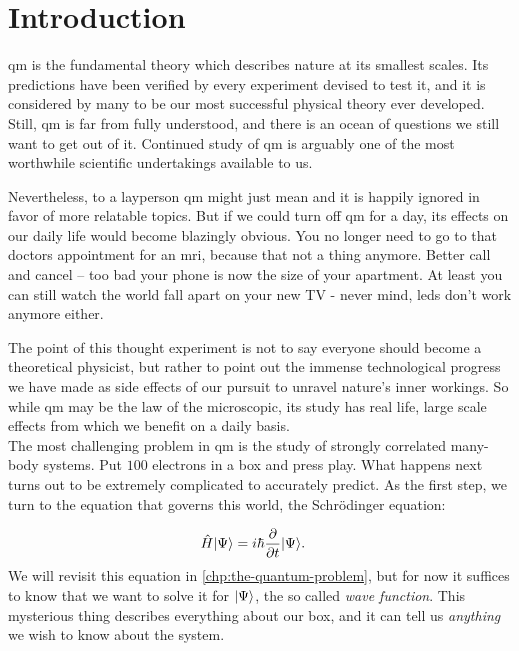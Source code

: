 \documentclass[Thesis.tex]{subfiles}
\begin{document}
\chapter{Introduction}
\label{chp:introduction}

\Gls{qm} is the fundamental theory which describes nature at its
smallest scales. Its predictions have been verified by every experiment
devised to test it, and it is considered by many to be our most successful physical
theory ever developed. Still, \gls{qm} is far from fully understood, and there is an ocean of
questions we still want to get out of it. Continued study of \gls{qm} is arguably one
of the most worthwhile scientific undertakings available to us.

Nevertheless, to a layperson \acrshort{qm} might just mean  and it
is happily ignored in favor of more relatable topics. But if we could turn off \gls{qm}
for a day, its effects on our daily life would become blazingly obvious. You no
longer need to go to that doctors appointment for an \acrshort{mri}, because that not a
thing anymore. Better call and cancel -- too bad your phone is now the size of
your apartment. At least you can still watch the world fall apart on your new TV -
never mind, \acrshort{led}s don't work anymore either.

The point of this thought experiment is not to say everyone should become a
theoretical physicist, but rather to point out the immense technological
progress we have made as side effects of our pursuit to unravel nature's inner
workings. So while \acrshort{qm} may be the law of the microscopic, its study
has real life, large scale effects from which we benefit on a daily basis.\\

The most challenging problem in \gls{qm} is the study of strongly correlated
many-body systems. Put $\num{100}$ electrons in a box and press play. What happens next
turns out to be extremely complicated to accurately predict. As the first step, we
turn to the equation that governs this world, the Schrödinger equation:

\begin{align}
  \label{eq:schrodinger-intro-def}
  \hat H| \Psi \rangle &= i\hbar \pdv{}{t}| \Psi \rangle.
\end{align}
We will revisit this equation in \cref{chp:the-quantum-problem}, but for now it
suffices to know that we want to solve it for $| \Psi \rangle$, the so called \emph{wave
function}. This mysterious thing describes everything about our box, and it can
tell us \emph{anything} we wish to know about the system.
\end{document}
